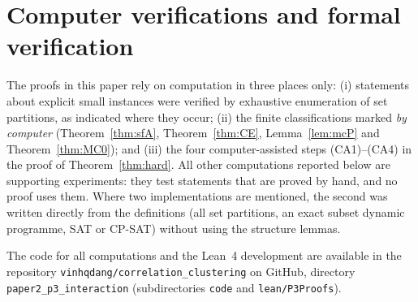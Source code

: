\section{Computer verifications and formal verification}\label{app:checks}
The proofs in this paper rely on computation in three places only: (i) statements about explicit small instances were verified by exhaustive enumeration of set partitions, as indicated where they occur; (ii) the finite classifications marked \emph{by computer} (Theorem~\ref{thm:sfA}, Theorem~\ref{thm:CE}, Lemma~\ref{lem:mcP} and Theorem~\ref{thm:MC0}); and (iii) the four computer-assisted steps (CA1)--(CA4) in the proof of Theorem~\ref{thm:hard}. All other computations reported below are supporting experiments: they test statements that are proved by hand, and no proof uses them. Where two implementations are mentioned, the second was written directly from the definitions (all set partitions, an exact subset dynamic programme, SAT or CP-SAT) without using the structure lemmas.

 The code for all computations and the Lean~4 development are available in the repository \texttt{vinhqdang/correlation\_clustering} on GitHub, directory \texttt{paper2\_p3\_interaction} (subdirectories \texttt{code} and \texttt{lean/P3Proofs}).

